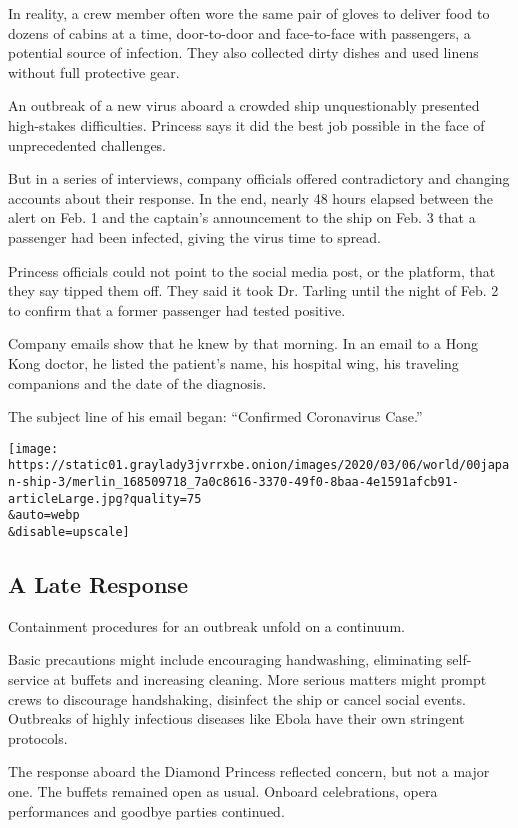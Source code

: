 In reality, a crew member often wore the same pair of gloves to deliver
food to dozens of cabins at a time, door-to-door and face-to-face with
passengers, a potential source of infection. They also collected dirty
dishes and used linens without full protective gear.

An outbreak of a new virus aboard a crowded ship unquestionably
presented high-stakes difficulties. Princess says it did the best job
possible in the face of unprecedented challenges.

But in a series of interviews, company officials offered contradictory
and changing accounts about their response. In the end, nearly 48 hours
elapsed between the alert on Feb. 1 and the captain's announcement to
the ship on Feb. 3 that a passenger had been infected, giving the virus
time to spread.

Princess officials could not point to the social media post, or the
platform, that they say tipped them off. They said it took Dr. Tarling
until the night of Feb. 2 to confirm that a former passenger had tested
positive.

Company emails show that he knew by that morning. In an email to a Hong
Kong doctor, he listed the patient's name, his hospital wing, his
traveling companions and the date of the diagnosis.

The subject line of his email began: ``Confirmed Coronavirus Case.''

\texttt{[image: https://static01.graylady3jvrrxbe.onion/images/2020/03/06/world/00japan-ship-3/merlin\_168509718\_7a0c8616-3370-49f0-8baa-4e1591afcb91-articleLarge.jpg?quality=75\\\&auto=webp\\\&disable=upscale]}

\hypertarget{a-late-response}{%
\subsection{A Late Response}\label{a-late-response}}

Containment procedures for an outbreak unfold on a continuum.

Basic precautions might include encouraging handwashing, eliminating
self-service at buffets and increasing cleaning. More serious matters
might prompt crews to discourage handshaking, disinfect the ship or
cancel social events. Outbreaks of highly infectious diseases like Ebola
have their own stringent protocols.

The response aboard the Diamond Princess reflected concern, but not a
major one. The buffets remained open as usual. Onboard celebrations,
opera performances and goodbye parties continued.


